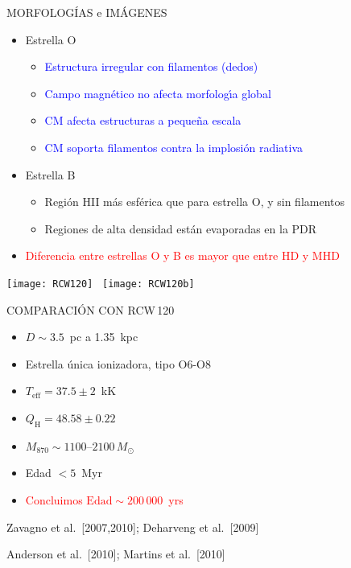 \documentclass
[
]
{beamer}
\newcommand\red{\textcolor{red}}
\newcommand\darkgreen{\textcolor{green!85!black}}
\newcommand\blue{\textcolor{blue}}
\begin{document}
{
\begin{frame}[plain]
\centerline{\large MORFOLOG\'{I}AS e IM\'AGENES}
\vfill
\begin{itemize}
\item<1-> Estrella O
 \begin{itemize}
\item<2-> \blue{  Estructura irregular con filamentos (dedos)}
    \item<2->\blue{   Campo magn\'etico no afecta morfolog\'{\i}a global}
\item<2->\blue{   CM afecta estructuras a peque\~na escala}
\item<2-> \blue{  CM soporta filamentos contra la implosi\'on radiativa }
\end{itemize}
\item<1-> Estrella B
\begin{itemize}
\item<3-> \darkgreen{  Regi\'on HII m\'as esf\'erica que para estrella O, y sin
  filamentos}
\item<3-> \darkgreen{  Regiones de alta densidad est\'an evaporadas en la PDR}
\end{itemize}
\item<4-> \red{ Diferencia entre estrellas O y B es mayor que entre HD y MHD}
\end{itemize}
\vfill
\end{frame}
}
{
\begin{frame}[plain]
\centerline{\large \color{white}{COMPARACI\'ON CON RCW\,120}}
\vfill
\centering
\centerline{\texttt{[image: RCW120]}~\hfill%
\texttt{[image: RCW120b]}}
\end{frame}
}
{
\begin{frame}[plain]
\centerline{\large{COMPARACI\'ON CON RCW\,120}}
\vfill
\begin{itemize}
\item $D \sim 3.5$~pc a 1.35~kpc 
\item Estrella \'unica ionizadora, tipo O6-O8
\item $T_\mathrm{eff} = 37.5\pm2$~kK
\item $Q_\mathrm{H} = 48.58\pm0.22$
\item $M_\mathrm{870} \sim 1100$--$2100\,M_\odot$
\item Edad $< 5$~Myr
\item \red{Concluimos $\mathrm{Edad} \sim 200\,000$~yrs}
\end{itemize}
\vfill
\centerline{{\small{Zavagno et al.\ [2007,2010]; Deharveng et al.\
    [2009]}}}
\centerline{{\small{Anderson et al.\ [2010]; Martins et al.\ [2010] }}}
\end{frame}
}
\end{document}
